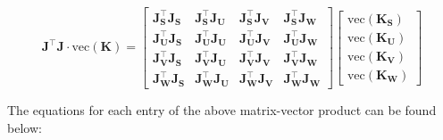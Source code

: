     \begin{equation}
        \mathbf{J^\intercal J} \cdot \text{vec}(\mathbf{K}) = 
        \left[
        \begin{array}{cccc}
            \mathbf{J_S^\intercal J_S} & \mathbf{J_S^\intercal J_U} & \mathbf{J_S^\intercal J_V} & \mathbf{J_S^\intercal J_W} \\
            \mathbf{J_U^\intercal J_S} & \mathbf{J_U^\intercal J_U} & \mathbf{J_U^\intercal J_V} & \mathbf{J_U^\intercal J_W} \\
            \mathbf{J_V^\intercal J_S} & \mathbf{J_V^\intercal J_U} & \mathbf{J_V^\intercal J_V} & \mathbf{J_V^\intercal J_W} \\
            \mathbf{J_W^\intercal J_S} & \mathbf{J_W^\intercal J_U} & \mathbf{J_W^\intercal J_V} & \mathbf{J_W^\intercal J_W}
        \end{array}
        \right]
        \left[
        \begin{array}{c}
            \text{vec}(\mathbf{K_S}) \\
            \text{vec}(\mathbf{K_U}) \\
            \text{vec}(\mathbf{K_V}) \\
            \text{vec}(\mathbf{K_W})
        \end{array}
        \right]
    \end{equation}

    The equations for each entry of the above matrix-vector product can be found below:

